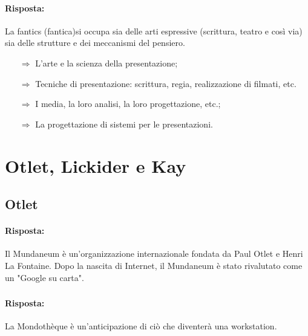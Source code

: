 
\paragraph{Risposta:} La fantics (fantica)si occupa sia delle arti espressive (scrittura, teatro e così via) sia
delle strutture e dei meccanismi del pensiero.

\begin{itemize}
    \item [$\Rightarrow$] L'arte e la scienza della presentazione;
    \item [$\Rightarrow$] Tecniche di presentazione: scrittura, regia, realizzazione di filmati, etc.
    \item [$\Rightarrow$] I media, la loro analisi, la loro progettazione, etc.;
    \item [$\Rightarrow$] La progettazione di sistemi per le presentazioni.
\end{itemize}

\section{Otlet, Lickider e Kay}

\subsection{Otlet}


\paragraph{Risposta:} Il Mundaneum è un'organizzazione internazionale fondata da Paul Otlet e Henri La Fontaine.
Dopo la nascita di Internet, il Mundaneum è stato rivalutato come un "Google su carta".

\subsubsection{}


\paragraph{Risposta:} La Mondothèque è un'anticipazione di ciò che diventerà una workstation.

